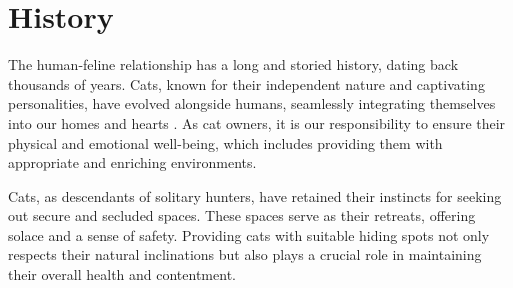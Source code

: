 \section{History}


The human-feline relationship has a long and storied history, dating back thousands of years. Cats, known for their independent nature and captivating personalities, have evolved alongside humans, seamlessly integrating themselves into our homes and hearts \cite{wiki:cat}. As cat owners, it is our responsibility to ensure their physical and emotional well-being, which includes providing them with appropriate and enriching environments.

Cats, as descendants of solitary hunters, have retained their instincts for seeking out secure and secluded spaces. These spaces serve as their retreats, offering solace and a sense of safety. Providing cats with suitable hiding spots not only respects their natural inclinations but also plays a crucial role in maintaining their overall health and contentment.

